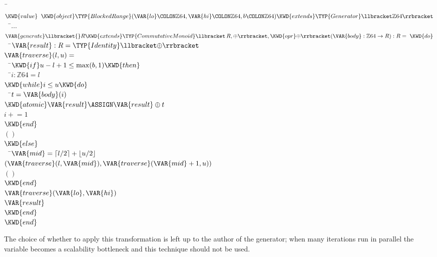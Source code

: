 \begin{Fortress}
{\tt~}\pushtabs\=\+\( \KWD{value}\;\;\KWD{object} \TYP{BlockedRange}(\VAR{lo}\COLON \mathbb{Z}64, \VAR{hi}\COLON \mathbb{Z}64, b\COLON \mathbb{Z}64) \KWD{extends} \TYP{Generator}\llbracket\mathbb{Z}64\rrbracket\)\\
{\tt~~}\pushtabs\=\+\(   \ldots\)\\
\(   \VAR{generate}\llbracket{}R \KWD{extends} \TYP{CommutativeMonoid}\llbracket\,R, \oplus\rrbracket, \KWD{opr} \mathord{\oplus}\rrbracket(\VAR{body} \mathrel{\mathtt{:}} \mathbb{Z}64 \rightarrow R) \mathrel{\mathtt{:}} R = \;\KWD{do}\)\\
{\tt~~}\pushtabs\=\+\(     \VAR{result} \mathrel{\mathtt{:}} R = \TYP{Identity}\llbracket\mathord{\oplus}\rrbracket\)\\
\(     \VAR{traverse}(l,u) =\)\\
{\tt~~}\pushtabs\=\+\(       \KWD{if} u-l+1 \leq \max(b,1) \KWD{then}\)\\
{\tt~~}\pushtabs\=\+\(         i \mathrel{\mathtt{:}} \mathbb{Z}64 = l\)\\
\(         \KWD{while} i \leq u \KWD{do}\)\\
{\tt~~}\pushtabs\=\+\(           t = \VAR{body}(i)\)\\
\(           \KWD{atomic} \VAR{result} \ASSIGN \VAR{result} \oplus t\)\\
\(           i \mathrel{+}= 1\)\-\\\poptabs
\(         \KWD{end}\)\\
\(         ()\)\-\\\poptabs
\(       \KWD{else}\)\\
{\tt~~}\pushtabs\=\+\(         \VAR{mid} = \lceil l/2 \rceil + \lfloor u/2 \rfloor\)\\
\(         (\VAR{traverse}(l,\VAR{mid}), \VAR{traverse}(\VAR{mid}+1,u))\)\\
\(         ()\)\-\\\poptabs
\(       \KWD{end}\)\-\\\poptabs
\(     \VAR{traverse}(\VAR{lo}, \VAR{hi})\)\\
\(     \VAR{result}\)\-\\\poptabs
\(   \KWD{end}\)\-\\\poptabs
\( \KWD{end}\)\-\\\poptabs
\end{Fortress}

The choice of whether to apply this transformation is left up to the
author of the generator; when many iterations run in parallel the
 variable becomes a scalability bottleneck and this
technique should not be used.

